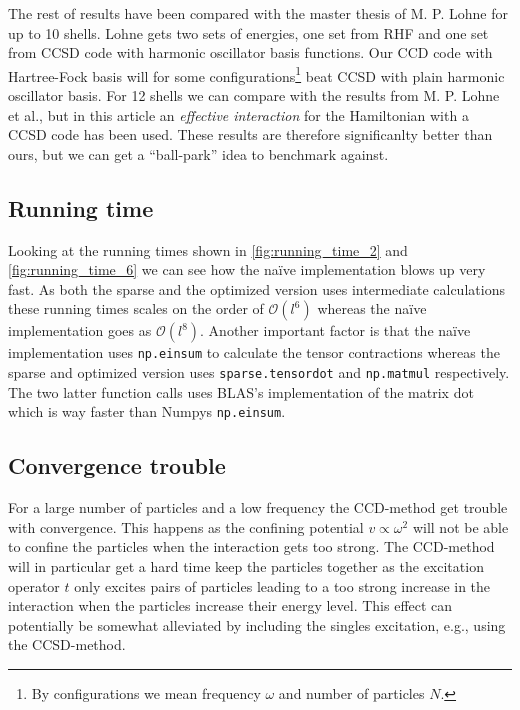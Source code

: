 \documentclass[
    a4paper, aps, twocolumn, floatfix, superscriptaddress,
    nofootinbib]{revtex4-1}
\newcommand{\1}{\mathds{1}}
\begin{document}
        The rest of results have been compared with the master thesis of M. P.
        Lohne\cite{lohne2010coupled} for up to 10 shells. Lohne gets two sets of
        energies, one set from RHF and one set from CCSD code with harmonic
        oscillator basis functions. Our CCD code with Hartree-Fock basis will
        for some configurations\footnote{By configurations we mean frequency
        $\omega$ and number of particles $N$.} beat CCSD with plain harmonic
        oscillator basis. For 12 shells we can compare with the results from M.
        P. Lohne et al.\cite{lohne2011ab}, but in this article an
        \emph{effective interaction} for the Hamiltonian with a CCSD code has
        been used. These results are therefore significanlty better than ours,
        but we can get a ``ball-park'' idea to benchmark against.

    \subsection{Running time}
        Looking at the running times shown in \autoref{fig:running_time_2} and
        \autoref{fig:running_time_6} we can see how the naïve implementation
        blows up very fast. As both the sparse and the optimized version uses
        intermediate calculations these running times scales on the order of
        $\mathcal{O}(l^6)$ whereas the naïve implementation goes as
        $\mathcal{O}(l^8)$. Another important factor is that the naïve
        implementation uses \texttt{np.einsum} to calculate the tensor
        contractions whereas the sparse and optimized version uses
        \texttt{sparse.tensordot} and \texttt{np.matmul} respectively. The two
        latter function calls uses BLAS's implementation of the matrix dot which
        is way faster than Numpys \texttt{np.einsum}.

    \subsection{Convergence trouble}
        For a large number of particles and a low frequency the CCD-method get
        trouble with convergence. This happens as the confining potential $v
        \propto \omega^2$ will not be able to confine the particles when the
        interaction gets too strong. The CCD-method will in particular get a
        hard time keep the particles together as the excitation operator $t$
        only excites pairs of particles leading to a too strong increase in the
        interaction when the particles increase their energy level. This effect
        can potentially be somewhat alleviated by including the singles
        excitation, e.g., using the CCSD-method.
\end{document}
